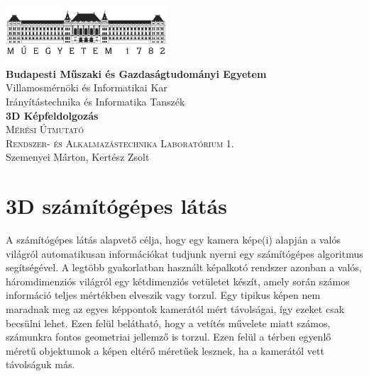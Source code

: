 \documentclass[12pt,a4paper,oneside]{report}             %
\author{\vikauthor}
\title{\viktitle}
\newcommand{\vikdept}{Irányítástechnika és Informatika Tanszék}
\newcommand{\viksubtitle}{Mérési Útmutató}
\newcommand{\viktitle}{3D Képfeldolgozás}
\newcommand{\vikdoktipus}{Rendszer- és Alkalmazástechnika Laboratórium 1.}
\newcommand{\vikauthor}{Szemenyei Márton, Kertész Zsolt}
\newcommand{\viktitle}{M10 – Egyidejű térképkészítés és lokalizáció (SLAM)}
\newcommand{\vikdoktipus}{Irányítástechnika és Képfeldolgozás Laboratórium 1.}
\newcommand{\vikauthor}{Szemenyei Márton}
\newcommand{\hsp}{\hspace{20pt}}
\begin{document}
\onehalfspacing

\begin{titlepage}
\begin{center}
\includegraphics[width=60mm,keepaspectratio]{images/logo.png}\\
\vspace{0.3cm}
\textbf{Budapesti Műszaki és Gazdaságtudományi Egyetem}\\
\textmd{Villamosmérnöki és Informatikai Kar}\\
\textmd{\vikdept}\\[5cm]

\vspace{0.4cm}
{\huge \bfseries \viktitle}\\[2cm]
\textsc{\Large \viksubtitle}\\[1cm]
\textsc{\Large \vikdoktipus}\\[6cm]

\vfill
{\large \vikauthor}
\end{center}
\end{titlepage}


\singlespacing
\tableofcontents\thispagestyle{fancy}
\titleformat{\chapter}[hang]{\Huge\bfseries}{\thechapter\hsp}{0pt}{\Huge\bfseries}
\onehalfspacing

\chapter{3D számítógépes látás}

A számítógépes látás alapvető célja, hogy egy kamera képe(i) alapján a valós világról automatikusan információkat tudjunk nyerni egy számítógépes algoritmus segítségével. A legtöbb gyakorlatban használt képalkotó rendszer azonban a valós, háromdimenziós világról egy kétdimenziós vetületet készít, amely során számos információ teljes mértékben elveszik vagy torzul. Egy tipikus képen nem maradnak meg az egyes képpontok kamerától mért távolságai, így ezeket csak becsülni lehet. Ezen felül belátható, hogy a vetítés művelete miatt számos, számunkra fontos geometriai jellemző is torzul. Ezen felül a térben egyenlő méretű objektumok a képen eltérő méretűek lesznek, ha a kamerától vett távolságuk más. 
\end{document}
